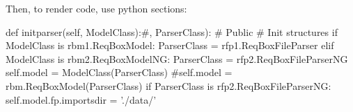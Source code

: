 \documentclass[a4paper]{article}
\begin{document}
Then, to render code, use python sections:

\begin{python}
    def initparser(self, ModelClass):#, ParserClass):
        # Public
        # Init structures
        if ModelClass is rbm1.ReqBoxModel:
            ParserClass = rfp1.ReqBoxFileParser
        elif ModelClass is rbm2.ReqBoxModelNG:
            ParserClass = rfp2.ReqBoxFileParserNG
        self.model = ModelClass(ParserClass)
        #self.model = rbm.ReqBoxModel(ParserClass)
        if ParserClass is rfp2.ReqBoxFileParserNG:
            self.model.fp.importsdir = './data/'
\end{python}
\end{document}
